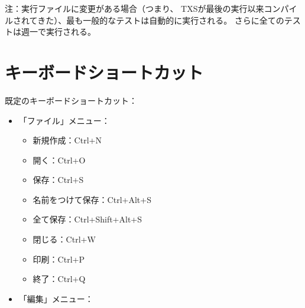 注：実行ファイルに変更がある場合（つまり、
TXSが最後の実行以来コンパイルされてきた）、最も一般的なテストは自動的に実行される。
さらに全てのテストは週一で実行される。

\section{キーボードショートカット}

既定のキーボードショートカット：

\begin{itemize}
\item
  「ファイル」メニュー：

  \begin{itemize}
  \item
    新規作成：Ctrl+N
  \item
    開く：Ctrl+O
  \item
    保存：Ctrl+S
  \item
    名前をつけて保存：Ctrl+Alt+S
  \item
    全て保存：Ctrl+Shift+Alt+S
  \item
    閉じる：Ctrl+W
  \item
    印刷：Ctrl+P
  \item
    終了：Ctrl+Q
  \end{itemize}
\item
  「編集」メニュー：


\end{itemize}
